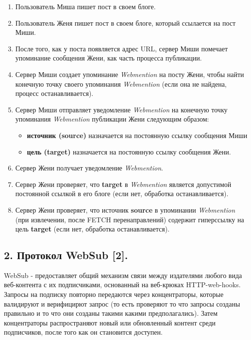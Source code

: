 \begin{enumerate}
\def\labelenumi{\arabic{enumi}.}
\tightlist
\item
  Пользователь Миша пишет пост в своем блоге.
\item
  Пользователь Женя пишет пост в своем блоге, который ссылается на пост
  Миши.
\item
  После того, как у поста появляется адрес URL, сервер Миши помечает
  упоминание сообщения Жени, как часть процесса публикации.
\item
  Сервер Миши создает упоминание \emph{Webmention} на посту Жени, чтобы
  найти конечную точку своего упоминания \emph{Webmention} (если она не
  найдена, процесс останавливается).
\item
  Сервер Миши отправляет уведомление \emph{Webmention} на конечную точку
  упоминания \emph{Webmention} публикации Жени следующим образом:

  \begin{itemize}
  \tightlist
  \item
    \textbf{источник (source)} назначается на постоянную ссылку
    сообщения Миши
  \item
    \textbf{цель (target)} назначается на постоянную ссылку сообщения
    Жени.
  \end{itemize}
\item
  Сервер Жени получает уведомление \emph{Webmention}.
\item
  Сервер Жени проверяет, что \textbf{target} в \emph{Webmention}
  является допустимой постоянной ссылкой в его блоге (если нет,
  обработка останавливается).
\item
  Сервер Жени проверяет, что источник \textbf{source} в упоминании
  \emph{Webmention} (при извлечении, после FETCH перенаправлений)
  содержит гиперссылку на цель \textbf{target} (если нет, обработка
  останавливается).
\end{enumerate}

\hypertarget{2-ux43fux440ux43eux442ux43eux43aux43eux43b-websub-2}{%
\subsection{2. Протокол WebSub
{[}2{]}.}\label{2-ux43fux440ux43eux442ux43eux43aux43eux43b-websub-2}}

WebSub - предоставляет общий механизм связи между издателями любого вида
веб-контента с их подписчиками, основанный на веб-крюках HTTP-web-hooks.
Запросы на подписку повторно передаются через концентраторы, которые
валидируют и верифицирют запрос (то есть проверяют то что запросы
созданы правильно и то что они созданы такими какими предполагались).
Затем концентраторы распространяют новый или обновленный контент среди
подписчиков, после того как он становится доступен.

